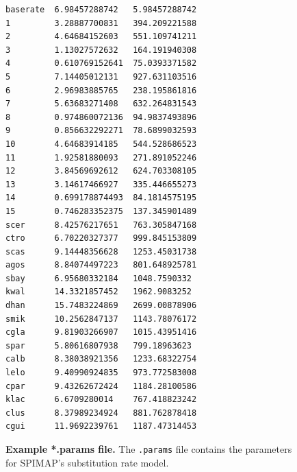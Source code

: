 \documentclass[11pt]{article}
\newcommand{\spimap}{{\sf\scshape SPIMAP}}
\begin{document}
\begin{figure}
\begin{center}
\small
\begin{lstlisting}[frame=tblr]
baserate  6.98457288742   5.98457288742
1         3.28887700831   394.209221588
2         4.64684152603   551.109741211
3         1.13027572632   164.191940308
4         0.610769152641  75.0393371582
5         7.14405012131   927.631103516
6         2.96983885765   238.195861816
7         5.63683271408   632.264831543
8         0.974860072136  94.9837493896
9         0.856632292271  78.6899032593
10        4.64683914185   544.528686523
11        1.92581880093   271.891052246
12        3.84569692612   624.703308105
13        3.14617466927   335.446655273
14        0.699178874493  84.1814575195
15        0.746283352375  137.345901489
scer      8.42576217651   763.305847168
ctro      6.70220327377   999.845153809
scas      9.14448356628   1253.45031738
agos      8.84074497223   801.648925781
sbay      6.95680332184   1048.7590332
kwal      14.3321857452   1962.9083252
dhan      15.7483224869   2699.00878906
smik      10.2562847137   1143.78076172
cgla      9.81903266907   1015.43951416
spar      5.80616807938   799.18963623
calb      8.38038921356   1233.68322754
lelo      9.40990924835   973.772583008
cpar      9.43262672424   1184.28100586
klac      6.6709280014    767.418823242
clus      8.37989234924   881.762878418
cgui      11.9692239761   1187.47314453
\end{lstlisting}


\end{center}

\caption{{\bf Example *.params file.}  The {\tt *.params} file contains the
parameters for \spimap's substitution rate model.}
\label{fig:params}
\end{figure}


%
\end{document}
